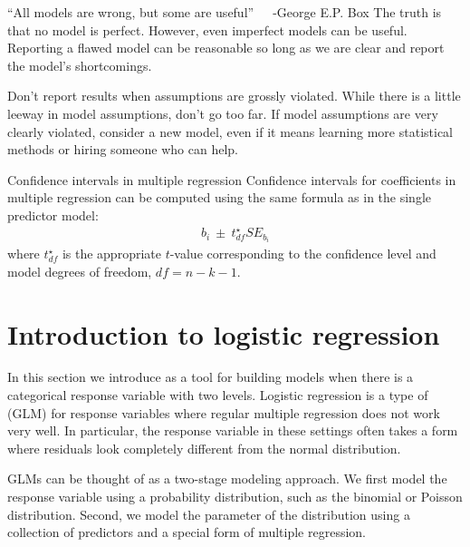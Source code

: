 \begin{onebox}{``All models are wrong, but some are useful''~~~-George E.P. Box}
The truth is that no model is perfect. However, even imperfect models can be useful. Reporting a flawed model can be reasonable so long as we are clear and report the model's shortcomings.
\end{onebox}

Don't report results when assumptions are grossly violated.
While there is a little leeway in model assumptions, don't go too far. If model assumptions are very clearly violated, consider a new model, even if it means learning more statistical methods or hiring someone who can help.

\begin{onebox}{Confidence intervals in multiple regression}
%
Confidence intervals for coefficients in multiple regression can be computed using the same formula as in the single predictor model:
\begin{align*}
b_i \ \pm\ t_{df}^{\star}SE_{b_{i}}
\end{align*}
where $t_{df}^{\star}$ is the appropriate $t$-value corresponding to the confidence level and model degrees of freedom, $df=n-k-1$.
\end{onebox}


\section{Introduction to logistic regression}
\label{logisticRegression}



In this section we introduce 
as a tool for building models when there is a categorical
response variable with two levels.
Logistic regression is a type of
 (GLM) for response variables
where regular multiple regression does not work very well.
In particular, the response variable in these settings often
takes a form where residuals look completely different from
the normal distribution.

GLMs can be thought of as a two-stage modeling approach.
We first model the response variable using a probability
distribution, such as the binomial or Poisson distribution.
Second, we model the parameter of the distribution using
a collection of predictors and a special form of multiple
regression.


